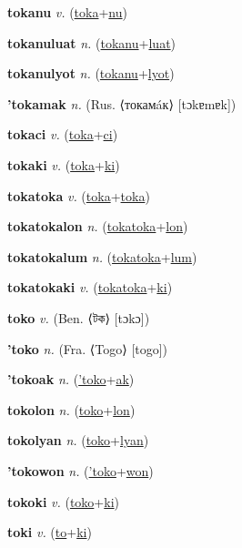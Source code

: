 \textbf{\hypertarget{tokanu}{tokanu}} \textit{v.} (\hyperlink{toka}{toka}+\allowbreak \hyperlink{nu}{nu})


\textbf{\hypertarget{tokanuluat}{tokanuluat}} \textit{n.} (\hyperlink{tokanu}{tokanu}+\allowbreak \hyperlink{luat}{luat})


\textbf{\hypertarget{tokanulyot}{tokanulyot}} \textit{n.} (\hyperlink{tokanu}{tokanu}+\allowbreak \hyperlink{lyot}{lyot})


\textbf{\hypertarget{'tokamak}{'tokamak}} \textit{n.} (Rus. ⟨токамáк⟩ [tɔkɐmɐk])


\textbf{\hypertarget{tokaci}{tokaci}} \textit{v.} (\hyperlink{toka}{toka}+\allowbreak \hyperlink{ci}{ci})


\textbf{\hypertarget{tokaki}{tokaki}} \textit{v.} (\hyperlink{toka}{toka}+\allowbreak \hyperlink{ki}{ki})


\textbf{\hypertarget{tokatoka}{tokatoka}} \textit{v.} (\hyperlink{toka}{toka}+\allowbreak \hyperlink{toka}{toka})


\textbf{\hypertarget{tokatokalon}{tokatokalon}} \textit{n.} (\hyperlink{tokatoka}{tokatoka}+\allowbreak \hyperlink{lon}{lon})


\textbf{\hypertarget{tokatokalum}{tokatokalum}} \textit{n.} (\hyperlink{tokatoka}{tokatoka}+\allowbreak \hyperlink{lum}{lum})


\textbf{\hypertarget{tokatokaki}{tokatokaki}} \textit{v.} (\hyperlink{tokatoka}{tokatoka}+\allowbreak \hyperlink{ki}{ki})


\textbf{\hypertarget{toko}{toko}} \textit{v.} (Ben. ⟨{\bengali{}টক}⟩ [tɔkɔ])


\textbf{\hypertarget{'toko}{'toko}} \textit{n.} (Fra. ⟨Togo⟩ [togo])


\textbf{\hypertarget{'tokoak}{'tokoak}} \textit{n.} (\hyperlink{'toko}{'toko}+\allowbreak \hyperlink{ak}{ak})


\textbf{\hypertarget{tokolon}{tokolon}} \textit{n.} (\hyperlink{toko}{toko}+\allowbreak \hyperlink{lon}{lon})


\textbf{\hypertarget{tokolyan}{tokolyan}} \textit{n.} (\hyperlink{toko}{toko}+\allowbreak \hyperlink{lyan}{lyan})


\textbf{\hypertarget{'tokowon}{'tokowon}} \textit{n.} (\hyperlink{'toko}{'toko}+\allowbreak \hyperlink{won}{won})


\textbf{\hypertarget{tokoki}{tokoki}} \textit{v.} (\hyperlink{toko}{toko}+\allowbreak \hyperlink{ki}{ki})


\textbf{\hypertarget{toki}{toki}} \textit{v.} (\hyperlink{to}{to}+\allowbreak \hyperlink{ki}{ki})



